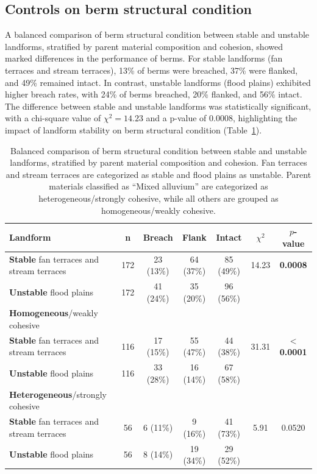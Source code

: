 \documentclass[review]{elsarticle}
\begin{document}
\subsection{Controls on berm structural condition}

A balanced comparison of berm structural condition between stable and unstable landforms, stratified by parent material composition and cohesion, showed marked differences in the performance of berms. For stable landforms (fan terraces and stream terraces), 13\% of berms were breached, 37\% were flanked, and 49\% remained intact. In contrast, unstable landforms (flood plains) exhibited higher breach rates, with 24\% of berms breached, 20\% flanked, and 56\% intact. The difference between stable and unstable landforms was statistically significant, with a chi-square value of $\chi^2 = 14.23$ and a p-value of 0.0008, highlighting the impact of landform stability on berm structural condition (Table~\ref{tab:stability_parentmat_chi}).

\begin{table}[h!]
\centering
\caption{\normalsize Balanced comparison of berm structural condition between stable and unstable landforms, stratified by parent material composition and cohesion. Fan terraces and stream terraces are categorized as stable and flood plains as unstable. Parent materials classified as ``Mixed alluvium'' are categorized as heterogeneous/strongly cohesive, while all others are grouped as homogeneous/weakly cohesive.}
\small
\begin{tabular}{|l|c|c|c|c|c|c|}
\hline
\textbf{Landform} & \textbf{n} & \textbf{Breach} & \textbf{Flank} & \textbf{Intact} & \textbf{$\chi^2$} & \textbf{$p$-value} \\
\hline
\textbf{Stable} fan terraces and stream terraces & 172 & 23 (13\%) & 64 (37\%) & 85 (49\%) & 14.23 & \textbf{0.0008} \\
\hline
\textbf{Unstable} flood plains & 172 & 41 (24\%) & 35 (20\%) & 96 (56\%) & & \\
\hline
\hline
\textbf{Homogeneous}/weakly cohesive & & & & & & \\
\hline
\textbf{Stable} fan terraces and stream terraces & 116 & 17 (15\%) & 55 (47\%) & 44 (38\%) & 31.31 & \textbf{$<$ 0.0001} \\
\hline
\textbf{Unstable} flood plains & 116 & 33 (28\%) & 16 (14\%) & 67 (58\%) & & \\
\hline
\hline
\textbf{Heterogeneous}/strongly cohesive & & & & & & \\
\hline
\textbf{Stable} fan terraces and stream terraces & 56 & 6 (11\%) & 9 (16\%) & 41 (73\%) & 5.91 & 0.0520 \\
\hline
\textbf{Unstable} flood plains & 56 & 8 (14\%) & 19 (34\%) & 29 (52\%) & & \\
\hline
\end{tabular}
\label{tab:stability_parentmat_chi}
\end{table}
\end{document}
